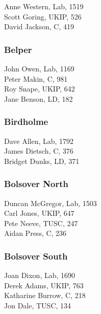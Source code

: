 \documentclass[a4paper,openany,10pt]{book}
\begin{document}


Anne Western, Lab, 1519\\
Scott Goring, UKIP, 526\\
David Jackson, C, 419\\


\subsubsection*{Belper}



John Owen, Lab, 1169\\
Peter Makin, C, 981\\
Roy Snape, UKIP, 642\\
Jane Benson, LD, 182\\


\subsubsection*{Birdholme}



Dave Allen, Lab, 1792\\
James Dietsch, C, 376\\
Bridget Dunks, LD, 371\\


\subsubsection*{Bolsover North}



Duncan McGregor, Lab, 1503\\
Carl Jones, UKIP, 647\\
Pete Neeve, TUSC, 247\\
Aidan Press, C, 236\\


\subsubsection*{Bolsover South}



Joan Dixon, Lab, 1690\\
Derek Adams, UKIP, 763\\
Katharine Burrow, C, 218\\
Jon Dale, TUSC, 134\\
\end{document}
